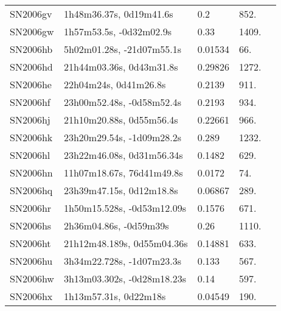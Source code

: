 \begin{longtable}{lllll}
         SN2006gv &        1h48m36.37s, 0d19m41.6s &      0.2 &           852. &    \citet{2006CBET..643A...1B} \\
         SN2006gw &        1h57m53.5s, -0d32m02.9s &     0.33 &          1409. &    \citet{2006CBET..643A...1B} \\
         SN2006hb &      5h02m01.28s, -21d07m55.1s &  0.01534 &            66. &    \citet{1989ESOLV.C...0000L} \\
         SN2006hd &       21h44m03.36s, 0d43m31.8s &  0.29826 &          1272. &    \citet{2016SDSSD.C...0000:} \\
         SN2006he &          22h04m24s, 0d41m26.8s &   0.2139 &           911. &    \citet{2011ApJ...740...92G} \\
         SN2006hf &      23h00m52.48s, -0d58m52.4s &   0.2193 &           934. &    \citet{2011ApJ...740...92G} \\
         SN2006hj &       21h10m20.88s, 0d55m56.4s &  0.22661 &           966. &    \citet{2016SDSSD.C...0000:} \\
         SN2006hk &      23h20m29.54s, -1d09m28.2s &    0.289 &          1232. &    \citet{2011ApJ...740...92G} \\
         SN2006hl &      23h22m46.08s, 0d31m56.34s &   0.1482 &           629. &    \citet{2011ApJ...740...92G} \\
         SN2006hn &      11h07m18.67s, 76d41m49.8s &   0.0172 &            74. &    \citet{1995ApJS..100...69F} \\
         SN2006hq &       23h39m47.15s, 0d12m18.8s &  0.06867 &           289. &    \citet{2016SDSSD.C...0000:} \\
         SN2006hr &     1h50m15.528s, -0d53m12.09s &   0.1576 &           671. &    \citet{2011ApJ...740...92G} \\
         SN2006hs &         2h36m04.86s, -0d59m39s &     0.26 &          1110. &    \citet{2006CBET..654A...1B} \\
         SN2006ht &     21h12m48.189s, 0d55m04.36s &  0.14881 &           633. &    \citet{2013ApJ...763...88C} \\
         SN2006hu &      3h34m22.728s, -1d07m23.3s &    0.133 &           567. &    \citet{2011ApJ...740...92G} \\
         SN2006hw &     3h13m03.302s, -0d28m18.23s &     0.14 &           597. &    \citet{2006CBET..656A...1B} \\
         SN2006hx &          1h13m57.31s, 0d22m18s &  0.04549 &           190. &    \citet{2003SDSS1.C...0000:} \\

\end{longtable}
